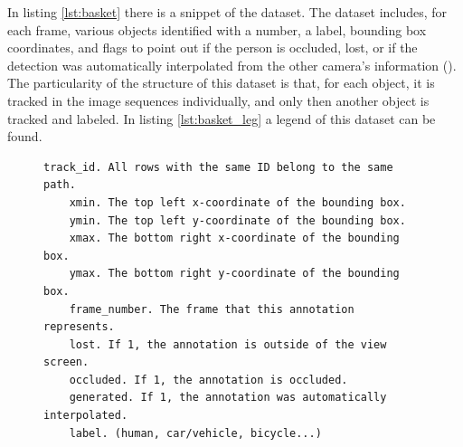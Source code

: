 In listing \ref{lst:basket} there is a snippet of the dataset. The dataset includes, for each frame, various objects identified with a number, a label, bounding box coordinates, and flags to point out if the person is occluded, lost, or if the detection was automatically interpolated from the other camera's information (\cite{EPFLEcolepolytechniquefederaledeLausanne}). The particularity of the structure of this dataset is that, for each object, it is tracked in the image sequences individually, and only then another object is tracked and labeled. In listing \ref{lst:basket_leg} a legend of this dataset can be found.

\begin{figure}[htp]

\begin{center}
	\begin{lstlisting}[label={lst:basket_leg}, caption={EPFL dataset legend.}]
	track_id. All rows with the same ID belong to the same path.
	xmin. The top left x-coordinate of the bounding box.
	ymin. The top left y-coordinate of the bounding box.
	xmax. The bottom right x-coordinate of the bounding box.
	ymax. The bottom right y-coordinate of the bounding box.
	frame_number. The frame that this annotation represents.
	lost. If 1, the annotation is outside of the view screen.
	occluded. If 1, the annotation is occluded.
	generated. If 1, the annotation was automatically interpolated.
	label. (human, car/vehicle, bicycle...)	\end{lstlisting}
\end{center}

\end{figure}
 



